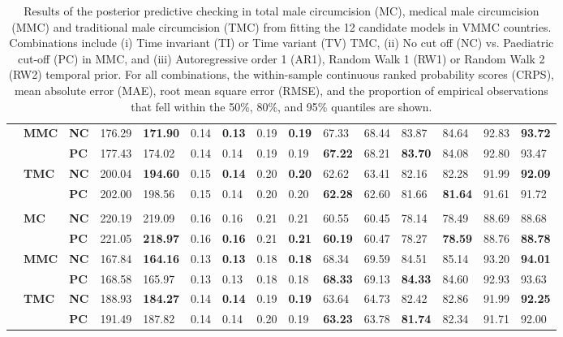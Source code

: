 \documentclass{article}
\begin{document}
\begin{landscape}
{\begin{table}[H]
\begin{tabular}{>{\bfseries}p{0.05cm} p{0.85cm} p{0.75cm} C{1.25cm} C{1.25cm} C{1.25cm} C{1.25cm} C{1.25cm} C{1.25cm} C{1.25cm} C{1.25cm} C{1.25cm} C{1.25cm} C{1.25cm} C{1.25cm}}
  & \bf MMC & \bf NC & 176.29 & \bf171.90 &   0.14 & \bf  0.13 &   0.19 & \bf  0.19 &  67.33 &  68.44 &  83.87 &  84.64 &  92.83 & \bf 93.72 & \\ 
  &  & \bf PC & 177.43 & 174.02 &   0.14 &   0.14 &   0.19 &   0.19 & \bf 67.22 &  68.21 & \bf 83.70 &  84.08 &  92.80 &  93.47 & \\[3pt] 
  & \bf TMC & \bf NC & 200.04 & \bf194.60 &   0.15 & \bf  0.14 &   0.20 & \bf  0.20 &  62.62 &  63.41 &  82.16 &  82.28 &  91.99 & \bf 92.09 & \\ 
  &  & \bf PC & 202.00 & 198.56 &   0.15 &   0.14 &   0.20 &   0.20 & \bf 62.28 &  62.60 &  81.66 & \bf 81.64 &  91.61 &  91.72 & \\[3pt] 
     \\ 
 & \bf MC & \bf NC & 220.19 & 219.09 &   0.16 &   0.16 &   0.21 &   0.21 &  60.55 &  60.45 &  78.14 &  78.49 &  88.69 &  88.68 & \\ 
  &  & \bf PC & 221.05 & \bf218.97 &   0.16 & \bf  0.16 &   0.21 & \bf  0.21 & \bf 60.19 &  60.47 &  78.27 & \bf 78.59 &  88.76 & \bf 88.78 & \\[3pt] 
  & \bf MMC & \bf NC & 167.84 & \bf164.16 &   0.13 & \bf  0.13 &   0.18 & \bf  0.18 &  68.34 &  69.59 &  84.51 &  85.14 &  93.20 & \bf 94.01 & \\ 
  &  & \bf PC & 168.58 & 165.97 &   0.13 &   0.13 &   0.18 &   0.18 & \bf 68.33 &  69.13 & \bf 84.33 &  84.60 &  92.93 &  93.63 & \\[3pt] 
  & \bf TMC & \bf NC & 188.93 & \bf184.27 &   0.14 & \bf  0.14 &   0.19 & \bf  0.19 &  63.64 &  64.73 &  82.42 &  82.86 &  91.99 & \bf 92.25 & \\ 
  &  & \bf PC & 191.49 & 187.82 &   0.14 &   0.14 &   0.20 &   0.19 & \bf 63.23 &  63.78 & \bf 81.74 &  82.34 &  91.71 &  92.00 & \\[3pt] 
  \hline 
  \end{tabular} 
  \caption{Results of the posterior predictive checking in total male 
    circumcision (MC), medical male circumcision (MMC) and traditional male 
    circumcision (TMC) from fitting the 12 candidate models in VMMC countries. Combinations include (i) Time invariant (TI) or Time variant (TV) TMC, 
    (ii) No cut off (NC) vs. Paediatric cut-off (PC) in MMC, and (iii) 
    Autoregressive order 1 (AR1), Random Walk 1 (RW1) or Random Walk 2 (RW2) 
    temporal prior. For all combinations, the within-sample continuous ranked 
    probability scores (CRPS), mean absolute error (MAE), root mean square 
    error (RMSE), and the proportion of empirical observations that fell within 
    the 50\%, 80\%, and 95\% quantiles are shown.} 
  \label{tab::PPC1 VMMC} 
\end{table}} 


\end{landscape}
\end{document}
